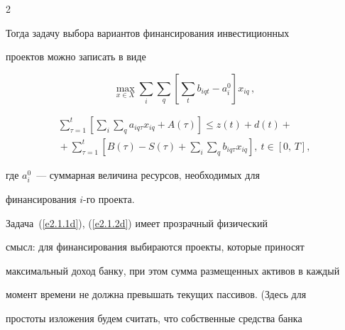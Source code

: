 \begin{multicols}{2}


     


     Тогда задачу выбора вариантов финансирования инвестиционных 


проектов можно записать в виде


     \begin{equation}


     \underset{x\in X}{\max} \sum\limits_i \sum\limits_q \left[ \sum\limits_t 


b_{iqt}-a_i^0\right ] x_{iq}\,,\label{e2.1.1d}


     \end{equation}


     


     \vspace*{-12pt}


     


     \noindent


     \begin{multline}


     \sum\limits_{\tau=1}^t\left[\sum\limits_i\sum\limits_q a_{iq\tau} 


x_{iq}+A(\tau)\right] \leq z(t)+d(t)+{}\\


\!\!{}+\sum\limits_{\tau=1}^t\left[ B(\tau)-S(\tau)+\sum\limits_i\sum\limits_q 


b_{iq\tau} x_{iq}\right ]\!\!,\ t\in [0,\,T],\!\!\!


     \label{e2.1.2d}


     \end{multline}


где $a_i^0$~--- суммарная величина ресурсов, необходимых для 


финансирования $i$-го проекта.


     


     Задача~(\ref{e2.1.1d}), (\ref{e2.1.2d}) имеет прозрачный физический 


смысл: для финансирования выбираются проекты, которые приносят 


максимальный доход банку, при этом сумма размещенных активов в каждый 


момент времени не должна превышать текущих пассивов. (Здесь для 


простоты изложения будем считать, что собственные средства банка 



\end{multicols}
